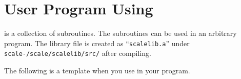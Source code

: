 \section{User Program Using {\scalelib}}

\scalelib is a collection of subroutines.
The subroutines can be used in an arbitrary program.
The library file is created as ``\verb|scalelib.a|'' under \texttt{scale-{\version}/scale/scalelib/src/} after compiling.

The following is a template when you use \scalelib in your program.

